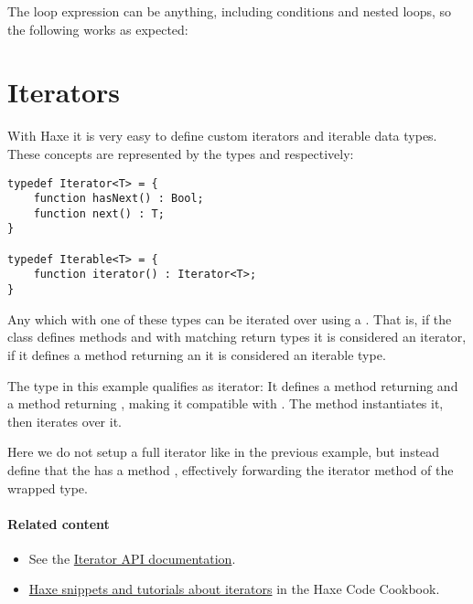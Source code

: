 The loop expression can be anything, including conditions and nested loops, so the following works as expected:



\section{Iterators}
\label{lf-iterators}

With Haxe it is very easy to define custom iterators and iterable data types. These concepts are represented by the types  and  respectively:

\begin{lstlisting}
typedef Iterator<T> = {
	function hasNext() : Bool;
	function next() : T;
}

typedef Iterable<T> = {
	function iterator() : Iterator<T>;
}
\end{lstlisting}

Any  which  with one of these types can be iterated over using a . That is, if the class defines methods  and  with matching return types it is considered an iterator, if it defines a method  returning an  it is considered an iterable type.


The type  in this example qualifies as iterator: It defines a method  returning  and a method  returning , making it compatible with . The  method instantiates it, then iterates over it.


Here we do not setup a full iterator like in the previous example, but instead define that the  has a method , effectively forwarding the iterator method of the wrapped  type. 

\paragraph{Related content}
\begin{itemize}
	\item See the \href{http://api.haxe.org/Iterator.html}{Iterator API documentation}. 
	\item \href{http://code.haxe.org/tag/iterator.html}{Haxe snippets and tutorials about iterators} in the Haxe Code Cookbook.
\end{itemize} 


